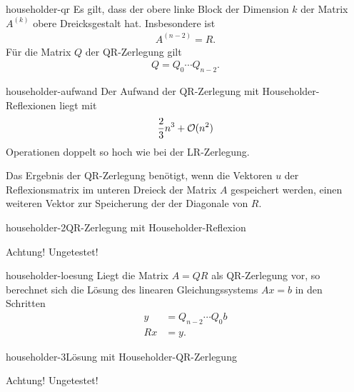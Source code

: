 \begin{Lemma}{householder-qr}
  Es gilt, dass der obere linke Block der Dimension $k$ der Matrix
  $A^{(k)}$ obere Dreicksgestalt hat. Insbesondere ist
  \begin{gather}
    A^{(n-2)} = R.
  \end{gather}
  Für die Matrix $Q$ der QR-Zerlegung gilt
  \begin{gather}
    Q = Q_0 \cdots Q_{n-2}.
  \end{gather}
\end{Lemma}

\begin{Lemma}{householder-aufwand}
  Der Aufwand der QR-Zerlegung mit Householder-Reflexionen liegt mit
  \begin{gather}
    \frac23 n^3 + \mathcal O(n^2)
  \end{gather}
  Operationen doppelt so hoch wie bei der LR-Zerlegung.

  Das Ergebnis der QR-Zerlegung benötigt, wenn die Vektoren $u$ der
  Reflexionsmatrix im unteren Dreieck der Matrix $A$ gespeichert
  werden, einen weiteren Vektor zur Speicherung der der Diagonale von
  $R$.
\end{Lemma}

\begin{Algorithmus*}{householder-2}{QR-Zerlegung mit Householder-Reflexion}
  
  
  Achtung! Ungetestet!
\end{Algorithmus*}

\begin{Lemma}{householder-loesung}
  Liegt die Matrix $A=QR$ als QR-Zerlegung vor, so berechnet sich die
  Lösung des linearen Gleichungssystems $Ax=b$ in den Schritten
  \begin{align}
    y &= Q_{n-2} \cdots Q_0 b\\
    Rx &= y.
  \end{align}
\end{Lemma}


\begin{Algorithmus*}{householder-3}{Lösung mit Householder-QR-Zerlegung}
  
  
  Achtung! Ungetestet!
\end{Algorithmus*}


